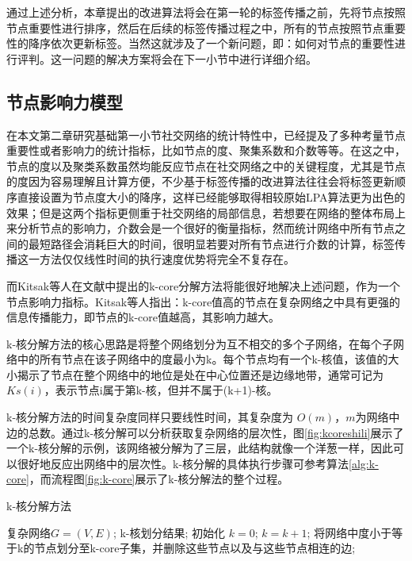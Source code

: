 通过上述分析，本章提出的改进算法将会在第一轮的标签传播之前，先将节点按照节点重要性进行排序，然后在后续的标签传播过程之中，所有的节点按照节点重要性的降序依次更新标签。当然这就涉及了一个新问题，即：如何对节点的重要性进行评判。这一问题的解决方案将会在下一小节中进行详细介绍。

\subsection{节点影响力模型}

在本文第二章研究基础第一小节社交网络的统计特性中，已经提及了多种考量节点重要性或者影响力的统计指标，比如节点的度、聚集系数和介数等等。在这之中，节点的度以及聚类系数虽然均能反应节点在社交网络之中的关键程度，尤其是节点的度因为容易理解且计算方便，不少基于标签传播的改进算法往往会将标签更新顺序直接设置为节点度大小的降序，这样已经能够取得相较原始LPA算法更为出色的效果；但是这两个指标更侧重于社交网络的局部信息，若想要在网络的整体布局上来分析节点的影响力，介数会是一个很好的衡量指标，然而统计网络中所有节点之间的最短路径会消耗巨大的时间，很明显若要对所有节点进行介数的计算，标签传播这一方法仅仅线性时间的执行速度优势将完全不复存在。

而Kitsak等人在文献\cite{Kitsak2010Identification}中提出的k-core分解方法将能很好地解决上述问题，作为一个节点影响力指标。Kitsak等人指出：k-core值高的节点在复杂网络之中具有更强的信息传播能力，即节点的k-core值越高，其影响力越大。

k-核分解方法的核心思路是将整个网络划分为互不相交的多个子网络，在每个子网络中的所有节点在该子网络中的度最小为k。每个节点均有一个k-核值，该值的大小揭示了节点在整个网络中的地位是处在中心位置还是边缘地带，通常可记为$Ks(i)$，表示节点i属于第k-核，但并不属于(k+1)-核。

k-核分解方法的时间复杂度同样只要线性时间，其复杂度为 $O(m)$，$m$为网络中边的总数。通过k-核分解可以分析获取复杂网络的层次性，图\ref{fig:kcoreshili}展示了一个k-核分解的示例，该网络被分解为了三层，此结构就像一个洋葱一样，因此可以很好地反应出网络中的层次性。k-核分解的具体执行步骤可参考算法\ref{alg:k-core}，而流程图\ref{fig:k-core}展示了k-核分解法的整个过程。

\begin{algorithm}[h]  
  \caption{k-核分解方法}  
  \label{alg:k-core} 
  \begin{algorithmic}[1]  
    \Require  
      复杂网络$G=(V,E)$;  
    \Ensure  
      k-核划分结果;  
    \State 初始化 $k=0$;  
    \Repeat  
      \State $k = k+1$;
      \Repeat 
        \State 将网络中度小于等于k的节点划分至k-core子集，并删除这些节点以及与这些节点相连的边;
  \end{algorithmic}  
\end{algorithm}  

